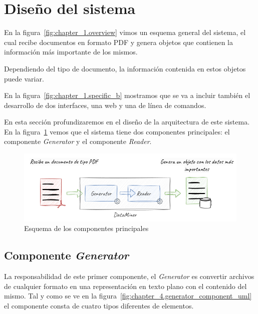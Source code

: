 \section{Diseño del sistema}\label{sec:diseno_del_sistema}

En la figura~\ref{fig:chapter_1.overview} vimos un esquema general del sistema, el cual recibe documentos en formato
PDF y genera objetos que contienen la información más importante de los mismos.

Dependiendo del tipo de documento, la información contenida en estos objetos puede variar.

En la figura~\ref{fig:chapter_1.specific_b} mostramos que se va a incluir también el desarrollo de dos interfaces, una
web y una de línea de comandos.

En esta sección profundizaremos en el diseño de la arquitectura de este sistema.
En la figura~\ref{fig:chapter_4.overview} vemos que el sistema tiene dos componentes principales: el componente
\textit{Generator} y el componente \textit{Reader}.

\begin{figure}[ht]
    \begin{center}
        \includegraphics[width=\textwidth]{./chapter/4/images/chapter_4.overview}
        \caption{Esquema de los componentes principales}
        \label{fig:chapter_4.overview}
    \end{center}
\end{figure}

\subsection*{Componente \textit{Generator}}\label{subsec:chapter_4.generator_component}

La responsabilidad de este primer componente, el \textit{Generator} es convertir archivos de cualquier formato en una
representación en texto plano con el contenido del mismo.
Tal y como se ve en la figura~\ref{fig:chapter_4.generator_component_uml} el componente consta de cuatro tipos
diferentes de elementos.

